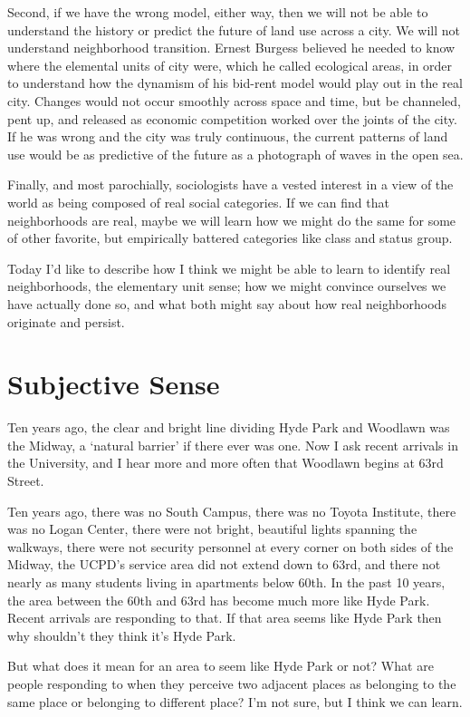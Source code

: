 \documentclass{article}
\begin{document}
Second, if we have the wrong model, either way, then we will not be
able to understand the history or predict the future of land use
across a city. We will not understand neighborhood transition. Ernest
Burgess believed he needed to know where the elemental units of city
were, which he called ecological areas, in order to understand how the
dynamism of his bid-rent model would play out in the real
city. Changes would not occur smoothly across space and time, but be
channeled, pent up, and released as economic competition worked over
the joints of the city.  If he was wrong and the city was truly
continuous, the current patterns of land use would be as predictive of
the future as a photograph of waves in the open sea.

Finally, and most parochially, sociologists have a vested interest in
a view of the world as being composed of real social categories. If we
can find that neighborhoods are real, maybe we will learn how we might
do the same for some of other favorite, but empirically battered
categories like class and status group.

Today I'd like to describe how I think we might be able to learn to
identify real neighborhoods, the elementary unit sense; how we might
convince ourselves we have actually done so, and what both might say
about how real neighborhoods originate and persist.

\section*{Subjective Sense}

Ten years ago, the clear and bright line dividing Hyde Park and
Woodlawn was the Midway, a `natural barrier' if there ever was
one. Now I ask recent arrivals in the University, and I hear more and
more often that Woodlawn begins at 63rd Street. 

Ten years ago, there was no South Campus, there was no Toyota
Institute, there was no Logan Center, there were not bright, beautiful
lights spanning the walkways, there were not security personnel at
every corner on both sides of the Midway, the UCPD's service area did
not extend down to 63rd, and there not nearly as many students living
in apartments below 60th. In the past 10 years, the area between the
60th and 63rd has become much more like Hyde Park. Recent arrivals are
responding to that. If that area seems like Hyde Park then why
shouldn't they think it's Hyde Park.

But what does it mean for an area to seem like Hyde Park or not? What
are people responding to when they perceive two adjacent places as
belonging to the same place or belonging to different place? I'm not
sure, but I think we can learn. 
\end{document}
